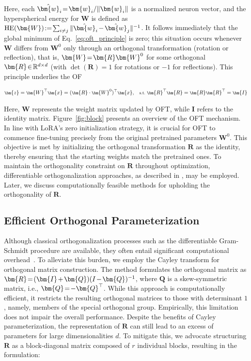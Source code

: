 Here, each $\thickmuskip=2mu \medmuskip=2mu \hat{\bm{w}}_i = \bm{w}_i/\|\bm{w}_i\|$ is a normalized neuron vector, and the hyperspherical energy for $\bm{W}$ is defined as $\thickmuskip=2mu \medmuskip=2mu \text{HE}(\bm{W}):= \sum_{i\neq j} \|\hat{\bm{w}}_i-\hat{\bm{w}}_j\|^{-1}$. It follows immediately that the global minimum of Eq.~\eqref{eq:oft_principle} is zero; this situation occurs whenever $\bm{W}$ differs from $\bm{W}^0$ only through an orthogonal transformation (rotation or reflection), that is, $\thickmuskip=2mu \medmuskip=2mu \bm{W} = \bm{R}\bm{W}^0$ for some orthogonal $\thickmuskip=2mu \medmuskip=2mu \bm{R} \in \mathbb{R}^{d \times d}$ (with $\det(\bm{R}) = 1$ for rotations or $-1$ for reflections). This principle underlies the OF

\begin{equation}\label{eq:oft_general}
    \footnotesize
    \bm{z}=\bm{W}^\top\bm{x}=(\bm{R}\cdot\bm{W}^0)^\top\bm{x},~~~\text{s.t.}~\bm{R}^\top\bm{R}=\bm{R}\bm{R}^\top=\bm{I}
\end{equation}

Here, $\bm{W}$ represents the weight matrix updated by OFT, while $\bm{I}$ refers to the identity matrix. Figure~\ref{fig:block} presents an overview of the OFT mechanism. In line with LoRA's zero initialization strategy, it is crucial for OFT to commence fine-tuning precisely from the original pretrained parameters $\bm{W}^0$. This objective is met by initializing the orthogonal transformation $\bm{R}$ as the identity, thereby ensuring that the starting weights match the pretrained ones. To maintain the orthogonality constraint on $\bm{R}$ throughout optimization, differentiable orthogonalization approaches, as described in \cite{liu2021orthogonal,lezcano2019cheap}, may be employed. Later, we discuss computationally feasible methods for upholding the orthogonality of $\bm{R}$.

\subsection{Efficient Orthogonal Parameterization}\label{sect:eff_ortho}

Although classical orthogonalization processes such as the differentiable Gram-Schmidt procedure are available, they often entail significant computational overhead~\cite{liu2021orthogonal}. To alleviate this burden, we employ the Cayley transform for orthogonal matrix construction. The method formulates the orthogonal matrix as $\thickmuskip=2mu \medmuskip=2mu \bm{R}=(\bm{I}+\bm{Q})(I-\bm{Q})^{-1}$, where $\bm{Q}$ is a skew-symmetric matrix, i.e., $\thickmuskip=2mu \medmuskip=2mu \bm{Q}=-\bm{Q}^\top$. While this approach is computationally efficient, it restricts the resulting orthogonal matrices to those with determinant $1$, namely, members of the special orthogonal group. Empirically, this limitation does not impair the overall performance. Despite the benefits of Cayley parameterization, the representation of $\bm{R}$ can still lead to an excess of parameters for large dimensionalities $d$. To mitigate this, we advocate structuring $\bm{R}$ as a block-diagonal matrix composed of $r$ individual blocks, resulting in the formulation:

